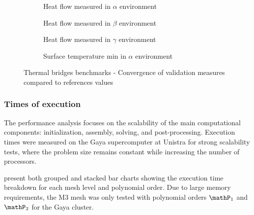 \begin{figure}[ht]
  \begin{subfigure}[c]{0.49\textwidth}
    \centering
    \caption{Heat flow measured in $\alpha$ environment}
  \end{subfigure}
  \hfill
  \begin{subfigure}[c]{0.49\textwidth}
    \centering
    \caption{Heat flow measured in $\beta$ environment}
  \end{subfigure}
  \hfill
  \begin{subfigure}[c]{0.49\textwidth}
    \centering
    \vspace*{0.03\textheight}
    \caption{Heat flow measured in $\gamma$ environment}
  \end{subfigure}
  \hfill
  \begin{subfigure}[c]{0.49\textwidth}
    \centering
    \vspace*{0.03\textheight}
    \caption{Surface temperature min in $\alpha$ environment}
  \end{subfigure}

  \caption{Thermal bridges benchmarks - Convergence of validation measures compared to references values}
  \label{fig:spec:app-feelpp-discr-1:thermal_bridges:measures_convergences}
\end{figure}



\subsubsection{Times of execution}

The performance analysis focuses on the scalability of the main computational components: initialization, assembly, solving, and post-processing. Execution times were measured on the Gaya supercomputer at Unistra for strong scalability tests, where the problem size remains constant while increasing the number of processors.

 present both grouped and stacked bar charts showing the execution time breakdown for each mesh level and polynomial order.
Due to large memory requirements, the M3 mesh was only tested with polynomial orders $\mathP_1$ and $\mathP_2$ for the Gaya cluster.

